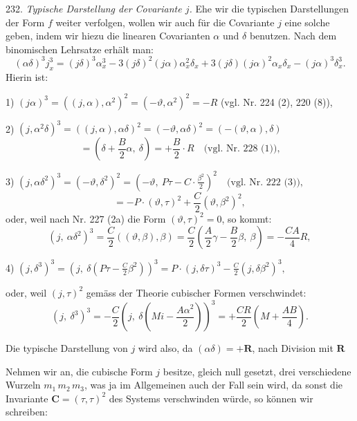 232. \textit{Typische Darstellung der Covariante $j$.} Ehe wir die typischen
Darstellungen der Form $f$ weiter verfolgen, wollen wir auch für die
Covariante $j$ eine solche geben, indem wir hiezu die linearen Covarianten
$\alpha$ und $\delta$ benutzen. Nach dem binomischen Lehrsatze erhält
man:
\[
(\alpha\delta)^3 j_x^3 = (j\delta)^3 \alpha_x^3 - 3(j\delta)^2(j\alpha)\alpha_x^2\delta_x + 3(j\delta)(j\alpha)^2\alpha_x\delta_x - (j\alpha)^3\delta_x^3.
\]
Hierin ist:

1) $(j\alpha)^3 = ((j,\alpha),\alpha^2)^2 = (-\vartheta,\alpha^2)^2 = -R$ (vgl. Nr. 224 (2), 220 (8)),

2) $(j,\alpha^2\delta)^3 = ((j,\alpha),\alpha\delta)^2 = (-\vartheta,\alpha\delta)^2 = (-(\vartheta,\alpha),\delta)$
\[
{} = \left(\delta + \frac{B}{2}\alpha,\ \delta\right) = +\frac{B}{2} \cdot R \quad \text{(vgl. Nr. 228 (1)),}
\]

3) $(j,\alpha\delta^2)^3 = (-\vartheta,\delta^2)^2 = \left(-\vartheta,\ P\tau - C \cdot \frac{\beta^2}{2}\right)^2 \quad \text{(vgl. Nr. 222 (3)),}$
\[
{} = -P \cdot (\vartheta,\tau)^2 + \frac{C}{2}(\vartheta,\beta^2)^2,
\]
oder, weil nach Nr. 227 (2a) die Form $(\vartheta,\tau)^2 = 0$, so kommt:
\[
(j,\ \alpha\delta^2)^3 = \frac{C}{2}\left((\vartheta,\beta),\beta\right) = \frac{C}{2}\left(\frac{A}{2}\gamma - \frac{B}{2}\beta,\ \beta\right) = -\frac{CA}{4}R,
\]

4) $(j,\delta^3)^3 = \left(j,\ \delta\left(P\tau - \frac{C}{2}\beta^2\right)\right)^3 = P \cdot (j,\delta\tau)^3 - \frac{C}{2}(j,\delta\beta^2)^3,$

oder, weil $(j,\tau)^2$ gemäss der Theorie cubischer Formen verschwindet:
\[
(j,\ \delta^3)^3 = -\frac{C}{2}\left(j,\ \delta\left(Mi - \frac{A\alpha^2}{2}\right)\right)^3 = +\frac{CR}{2}\left(M + \frac{AB}{4}\right).
\]


Die typische Darstellung von $j$ wird also, da $(\alpha\delta) = +\mathbf{R}$, nach
Division mit $\mathbf{R}$


Nehmen wir an, die cubische Form $j$ besitze, gleich null gesetzt, drei
verschiedene Wurzeln $m_1\,m_2\,m_3$, was ja im Allgemeinen auch der
Fall sein wird, da sonst die Invariante $\mathbf{C} = (\tau,\tau)^2$ des Systems
verschwinden würde, so können wir schreiben:

